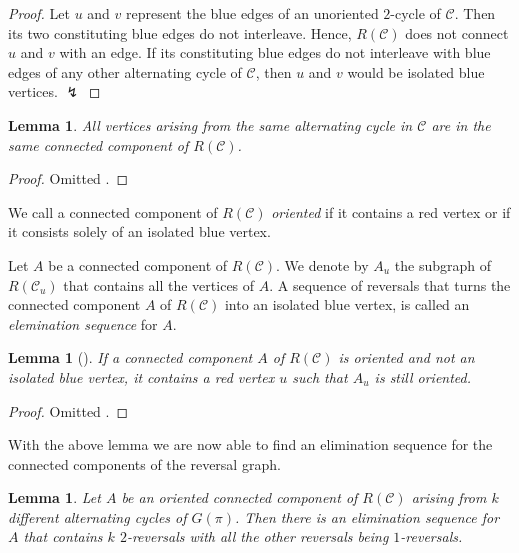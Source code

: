 \documentclass[11pt,DIV=11]{scrartcl}
\newtheorem{lemma}[theorem]{Lemma}
\theoremstyle{definition}
\theoremstyle{remark}
\begin{document}
\begin{proof}
Let $u$ and $v$ represent the blue edges of an unoriented $2$-cycle of $\mathcal{C}$. Then its two constituting blue edges do not interleave. Hence, $R(\mathcal{C})$ does not connect $u$ and $v$ with an edge. If its constituting blue edges do not interleave with blue edges of any other alternating cycle of $\mathcal{C}$, then $u$ and $v$ would be isolated blue vertices. $\lightning$
\end{proof}

\begin{lemma}
\label{lem:6}
All vertices arising from the same alternating cycle in $\mathcal{C}$ are in the same connected component of $R(\mathcal{C})$.
\end{lemma}

\begin{proof}
Omitted \cite{Christie1998}.
\end{proof}

We call a connected component of $R(\mathcal{C})$ \textit{oriented} if it contains a red vertex or if it consists solely of an isolated blue vertex.

Let $A$ be a connected component of $R(\mathcal{C})$. We denote by $A_u$ the subgraph of $R(\mathcal{C}_u)$ that contains all the vertices of $A$. A sequence of reversals that turns the connected component $A$ of $R(\mathcal{C})$ into an isolated blue vertex, is called an \textit{elemination sequence} for $A$.

\begin{lemma}[\citeauthor*{Christie1998}]
\label{lem:7}
If a connected component $A$ of $R(\mathcal{C})$ is oriented and not an isolated blue vertex, it contains a red vertex $u$ such that $A_u$ is still oriented.
\end{lemma}

\begin{proof}
Omitted \cite{Christie1998}.
\end{proof}

With the above lemma we are now able to find an elimination sequence for the connected components of the reversal graph.

\begin{lemma}
\label{lem:8}
Let $A$ be an oriented connected component of $R(\mathcal{C})$ arising from $k$ different alternating cycles of $G(\pi)$. Then there is an elimination sequence for $A$ that contains $k$ $2$-reversals with all the other reversals being $1$-reversals.
\end{lemma}
\end{document}
